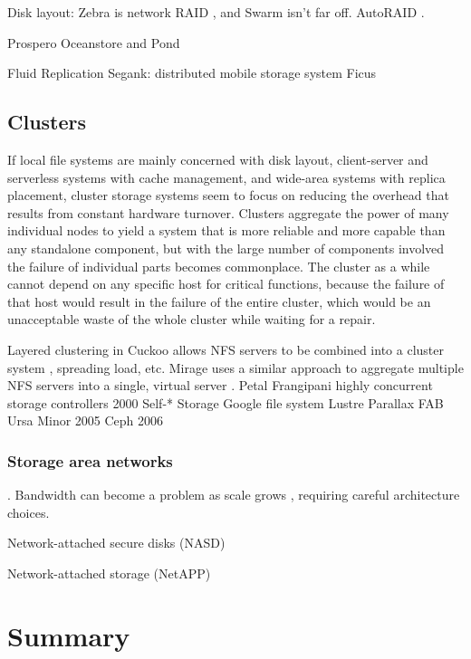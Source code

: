 Disk layout:
Zebra \cite{hartman93} is network RAID \cite{patterson}, and Swarm \cite{hartman99} isn't far off. AutoRAID \cite{wilkes95}.

Prospero \cite{neuman}
Oceanstore and Pond \cite{kubiatowicz,rhea}

Fluid Replication \cite{kim}
Segank: distributed mobile storage system \cite{sobti}
Ficus \cite{popek}



\subsection{Clusters}

If local file systems are mainly concerned with disk layout, client-server and serverless systems with cache management, and wide-area systems with replica placement, cluster storage systems seem to focus on reducing the overhead that results from constant hardware turnover. Clusters aggregate the power of many individual nodes to yield a system that is more reliable and more capable than any standalone component, but with the large number of components involved the failure of individual parts becomes commonplace. The cluster as a while cannot depend on any specific host for critical functions, because the failure of that host would result in the failure of the entire cluster, which would be an unacceptable waste of the whole cluster while waiting for a repair.





Layered clustering in Cuckoo allows NFS servers to be combined into a cluster system \cite{klosterman}, spreading load, etc. Mirage uses a similar approach to aggregate multiple NFS servers into a single, virtual server \cite{baker02}.
Petal \cite{lee95,lee96}
Frangipani \cite{thekkath}
highly concurrent storage controllers \cite{amiri} 2000
Self-* Storage \cite{ganger03}
Google file system \cite{ghemawat}
Lustre \cite{lustre}
Parallax \cite{warfield}
FAB \cite{frolund,saito04,ji}
Ursa Minor \cite{abd-el-malek} 2005
Ceph \cite{weil} 2006

\subsubsection{Storage area networks}

\cite{burns}. Bandwidth can become a problem as scale grows \cite{hospodor}, requiring careful architecture choices.

Network-attached secure disks (NASD) \cite{gibson97,gibson98a}

Network-attached storage (NetAPP) \cite{hitz}

\section{Summary}
